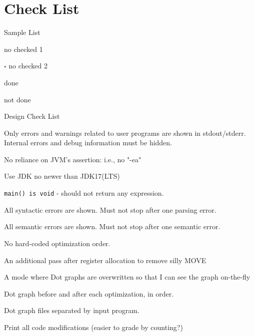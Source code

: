 


\newpage
\section*{Check List}

Sample List
\begin{todolist}
\item no checked 1
\item[$\square$] no checked 2
\item[\cmark] done
\item[\xmark] not done
\end{todolist}

\vspace{2em}



\vspace{2em}
Design Check List
\begin{todolist}
    \item Only errors and warnings related to user programs are shown in stdout/stderr. Internal errors and debug information must be hidden.
    \item No reliance on JVM's assertion: i.e., no "-ea"
    \item Use JDK no newer than JDK17(LTS) 
    \item \texttt{main() is void} - should not return any expression.
    \item All syntactic errors are shown. Must not stop after one parsing error.
    \item All semantic errors are shown. Must not stop after one semantic error.
    \item No hard-coded optimization order.
    \item An additional pass after register allocation to remove silly MOVE
    \item A mode where Dot graphs are overwritten so that I can see the graph on-the-fly
    \item Dot graph before and after each optimization, in order.
    \item Dot graph files separated by input program.
    \item Print all code modifications (easier to grade by counting?)
\end{todolist}


\clearpage